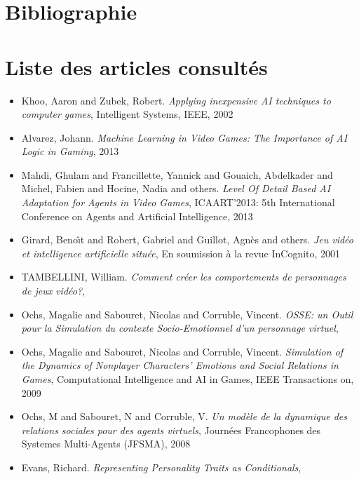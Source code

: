 \documentclass[asi]{picINSAIA}
\begin{document}
\chapter{Bibliographie}
\begingroup
\def\chapter*#1{}
{}

\endgroup

\chapter{Liste des articles consultés}
\begin{itemize}

\item Khoo, Aaron and Zubek, Robert.
  \textsl{Applying inexpensive AI techniques to computer games}, 
  Intelligent Systems, IEEE, 
2002


\item Alvarez, Johann.
  \textsl{Machine Learning in Video Games: The Importance of AI Logic in Gaming},
  2013


\item Mahdi, Ghulam and Francillette, Yannick and Gouaich, Abdelkader and Michel, Fabien and Hocine, Nadia and others.
  \textsl{Level Of Detail Based AI Adaptation for Agents in Video Games},
  ICAART'2013: 5th International Conference on Agents and Artificial Intelligence,
  2013


\item Girard, Beno{\^\i}t and Robert, Gabriel and Guillot, Agn{\`e}s and others.
  \textsl{Jeu vid{\'e}o et intelligence artificielle situ{\'e}e},
  En soumission {\`a} la revue InCognito,
  2001


\item TAMBELLINI, William.
  \textsl{Comment cr{\'e}er les comportements de personnages de jeux vid{\'e}o?},



\item Ochs, Magalie and Sabouret, Nicolas and Corruble, Vincent.
  \textsl{OSSE: un Outil pour la Simulation du contexte Socio-Emotionnel d’un personnage virtuel},



\item Ochs, Magalie and Sabouret, Nicolas and Corruble, Vincent.
  \textsl{Simulation of the Dynamics of Nonplayer Characters' Emotions and Social Relations in Games},
  Computational Intelligence and AI in Games, IEEE Transactions on,
  2009


\item Ochs, M and Sabouret, N and Corruble, V.
  \textsl{Un mod{\`e}le de la dynamique des relations sociales pour des agents virtuels},
  Journ{\'e}es Francophones des Systemes Multi-Agents (JFSMA),
  2008


\item Evans, Richard.
  \textsl{Representing Personality Traits as Conditionals},


\end{itemize}
\end{document}
